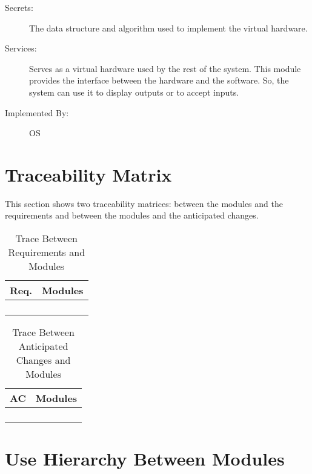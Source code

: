 \documentclass[12pt]{article}
\begin{document}
\begin{description}
\item[Secrets:]The data structure and algorithm used to implement the virtual
  hardware.
\item[Services:]Serves as a virtual hardware used by the rest of the
  system. This module provides the interface between the hardware and the
  software. So, the system can use it to display outputs or to accept inputs.
\item[Implemented By:] OS
\end{description}



\section{Traceability Matrix}
This section shows two traceability matrices: between the modules and 
the 
requirements and between the modules and the anticipated changes. 
\smallskip
\begin{table}[!htbp]
	\centering
	\begin{tabular}{p{3cm}|p{9cm}}
		\textbf{Req.} & \textbf{Modules} \\\hline
		&  \\
		&  \\
		&  \\
		&  \\\hline
	\end{tabular}
	\caption{Trace Between Requirements and Modules}
	\label{Trace Between Requirements and Modules}
\end{table}
\begin{table}[!htbp]
	\centering
	\begin{tabular}{p{3cm}|p{9cm}}
		\textbf{AC} & \textbf{Modules} \\\hline
		&  \\
		&  \\
		&  \\
		&  \\\hline
	\end{tabular}
	\caption{Trace Between Anticipated Changes and Modules}
	\label{Trace Between Anticipated Changes and Modules}
\end{table}
\section{Use Hierarchy Between Modules}
\end{document}
